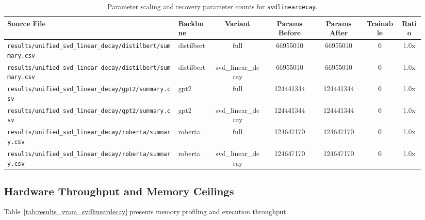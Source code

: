 \begin{table}[t]
\centering
\small
\begin{tabular}{llccccc}
\toprule
\textbf{Source File} & \textbf{Backbone} & \textbf{Variant} & \textbf{Params Before} & \textbf{Params After} & \textbf{Trainable} & \textbf{Ratio} \\
\midrule
\texttt{results/unified\_svd\_linear\_decay/distilbert/summary.csv} & distilbert & full & 66955010 & 66955010 & 0 & 1.0x \\
\texttt{results/unified\_svd\_linear\_decay/distilbert/summary.csv} & distilbert & svd\_linear\_decay & 66955010 & 66955010 & 0 & 1.0x \\
\texttt{results/unified\_svd\_linear\_decay/gpt2/summary.csv} & gpt2 & full & 124441344 & 124441344 & 0 & 1.0x \\
\texttt{results/unified\_svd\_linear\_decay/gpt2/summary.csv} & gpt2 & svd\_linear\_decay & 124441344 & 124441344 & 0 & 1.0x \\
\texttt{results/unified\_svd\_linear\_decay/roberta/summary.csv} & roberta & full & 124647170 & 124647170 & 0 & 1.0x \\
\texttt{results/unified\_svd\_linear\_decay/roberta/summary.csv} & roberta & svd\_linear\_decay & 124647170 & 124647170 & 0 & 1.0x \\
\bottomrule
\end{tabular}
\caption{Parameter scaling and recovery parameter counts for \texttt{svdlineardecay}.}
\label{tab:results_params_svdlineardecay}
\end{table}

\subsection{Hardware Throughput and Memory Ceilings}
Table~\ref{tab:results_vram_svdlineardecay} presents memory profiling and execution throughput.

